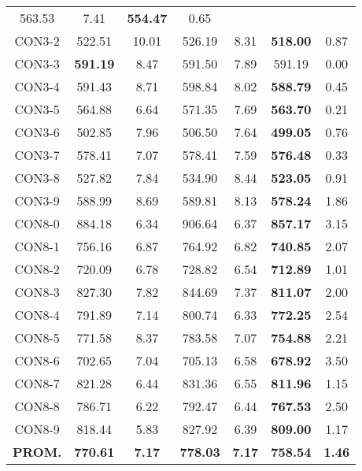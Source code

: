 \begin{table}[ht]
\begin{tabular}{c c c c c c c}
563.53 & 7.41 & \bf{554.47} & 
0.65\\CON3-2 & 522.51 & 10.01 & 
526.19 & 8.31 & \bf{518.00} & 
0.87\\CON3-3 & \bf{591.19} & 8.47 & 
591.50 & 7.89 & 591.19 & 0.00\\
CON3-4 & 591.43 & 8.71 & 
598.84 & 8.02 & \bf{588.79} & 
0.45\\CON3-5 & 564.88 & 6.64 & 
571.35 & 7.69 & \bf{563.70} & 
0.21\\CON3-6 & 502.85 & 7.96 & 
506.50 & 7.64 & \bf{499.05} & 
0.76\\CON3-7 & 578.41 & 7.07 & 
578.41 & 7.59 & \bf{576.48} & 
0.33\\CON3-8 & 527.82 & 7.84 & 
534.90 & 8.44 & \bf{523.05} & 
0.91\\CON3-9 & 588.99 & 8.69 & 
589.81 & 8.13 & \bf{578.24} & 
1.86\\CON8-0 & 884.18 & 6.34 & 
906.64 & 6.37 & \bf{857.17} & 
3.15\\CON8-1 & 756.16 & 6.87 & 
764.92 & 6.82 & \bf{740.85} & 
2.07\\CON8-2 & 720.09 & 6.78 & 
728.82 & 6.54 & \bf{712.89} & 
1.01\\CON8-3 & 827.30 & 7.82 & 
844.69 & 7.37 & \bf{811.07} & 
2.00\\CON8-4 & 791.89 & 7.14 & 
800.74 & 6.33 & \bf{772.25} & 
2.54\\CON8-5 & 771.58 & 8.37 & 
783.58 & 7.07 & \bf{754.88} & 
2.21\\CON8-6 & 702.65 & 7.04 & 
705.13 & 6.58 & \bf{678.92} & 
3.50\\CON8-7 & 821.28 & 6.44 & 
831.36 & 6.55 & \bf{811.96} & 
1.15\\CON8-8 & 786.71 & 6.22 & 
792.47 & 6.44 & \bf{767.53} & 
2.50\\CON8-9 & 818.44 & 5.83 & 
827.92 & 6.39 & \bf{809.00} & 
1.17\\\bf{PROM.} & 
\bf{770.61} & \bf{7.17} & \bf{778.03} & \bf{7.17} & \bf{758.54} & \bf{1.46}\\[1ex]\hline
\end{tabular}
\label{table:nonlin}
\end{table} \clearpage
